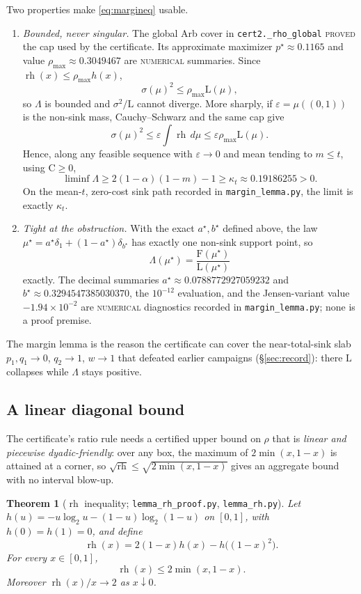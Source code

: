 \documentclass[11pt]{article}
\theoremstyle{plain}
\newtheorem{theorem}{Theorem}[section]
\theoremstyle{definition}
\theoremstyle{remark}
\newcommand{\rh}{\operatorname{rh}}
\newcommand{\Lb}{\mathrm{L}}
\newcommand{\Cc}{\mathrm{C}}
\newcommand{\Ff}{\mathrm{F}}
\newcommand{\Lh}{\Lambda}
\newcommand{\PROVED}{\textsc{proved}}
\newcommand{\NUMERICAL}{\textsc{numerical}}
\begin{document}
Two properties make \eqref{eq:margineq} usable.
\begin{enumerate}
\item \emph{Bounded, never singular.}
The global Arb cover in \texttt{cert2.\_rho\_global} \PROVED{} the cap used
by the certificate.  Its approximate maximizer
$p^\star\approx0.1165$ and value
$\rho_{\max}\approx0.3049467$ are \NUMERICAL{} summaries.  Since
$\rh(x)\le\rho_{\max}h(x)$,
\[
\sigma(\mu)^2\le \rho_{\max}\Lb(\mu),
\]
so $\Lh$ is bounded and $\sigma^2/\Lb$ cannot diverge.  More sharply, if
\(\varepsilon=\mu((0,1))\) is the non-sink mass, Cauchy--Schwarz and the same
cap give
\[
\sigma(\mu)^2\le \varepsilon\int\rh\,d\mu
\le\varepsilon\rho_{\max}\Lb(\mu).
\]
Hence, along any feasible sequence with \(\varepsilon\to0\) and mean tending
to \(m\le t\), using \(\Cc\ge0\),
\[
\liminf\Lh\ge2(1-\alpha)(1-m)-1
\ge\kappa_t\approx0.19186255>0.
\]
On the mean-\(t\), zero-cost sink path recorded in
\texttt{margin\_lemma.py}, the limit is exactly \(\kappa_t\).
\item \emph{Tight at the obstruction.}
With the exact $a^\star,b^\star$ defined above, the law
$\mu^\star=a^\star\delta_1+(1-a^\star)\delta_{b^\star}$ has exactly one
non-sink support point, so
\[
\Lh(\mu^\star)=\frac{\Ff(\mu^\star)}{\Lb(\mu^\star)}
\]
exactly.  The decimal summaries
$a^\star\approx0.0788772927059232$ and
$b^\star\approx0.3294547385030370$, the $10^{-12}$ evaluation, and the
Jensen-variant value $-1.94\times10^{-2}$ are \NUMERICAL{} diagnostics
recorded in \texttt{margin\_lemma.py}; none is a proof premise.
\end{enumerate}

The margin lemma is the reason the certificate can cover the near-total-sink
slab $p_1,q_1\to0$, $q_2\to1$, $w\to1$ that defeated earlier campaigns
(\S\ref{sec:record}): there $\Lb$ collapses while $\Lh$ stays positive.

\subsection{A linear diagonal bound}
\label{sec:rh}

The certificate's ratio rule needs a certified upper bound on $\rho$ that is
\emph{linear and piecewise dyadic-friendly}: over any box, the maximum of
$2\min(x,1-x)$ is attained at a corner, so
$\sqrt{\rh}\le\sqrt{2\min(x,1-x)}$ gives an aggregate bound with no interval
blow-up.

\begin{theorem}[$\rh$ inequality; \texttt{lemma\_rh\_proof.py},
\texttt{lemma\_rh.py}]
\label{thm:rh}
Let $h(u)=-u\log_2u-(1-u)\log_2(1-u)$ on $[0,1]$, with
$h(0)=h(1)=0$, and define
\[
\rh(x)=2(1-x)h(x)-h\bigl((1-x)^2\bigr).
\]
For every $x\in[0,1]$,
\begin{equation}
\rh(x)\le2\min(x,1-x).
\label{eq:rhbound}
\end{equation}
Moreover $\rh(x)/x\to2$ as $x\downarrow0$.
\end{theorem}
\end{document}
